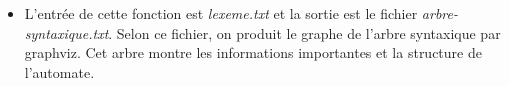 \documentclass[a4paper,14pt,UTF8]{article}
\begin{document}
\begin{itemize}

		
		\vspace{2pt}
		
		\item 
		L'entrée de cette fonction est \textit{lexeme.txt} et la sortie est le fichier \textit{arbre-syntaxique.txt}. Selon ce fichier, on produit le graphe de l'arbre syntaxique par graphviz. Cet arbre montre les informations importantes et la structure de l'automate. \par
		

\end{itemize}
\end{document}
